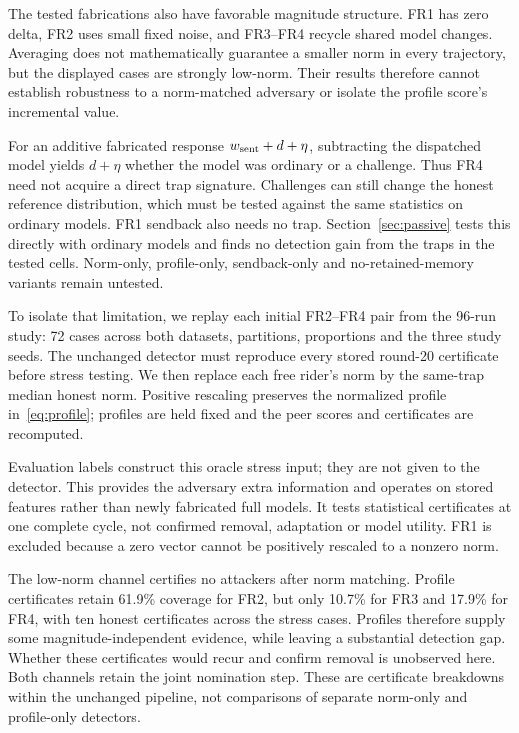 \documentclass[journal]{IEEEtran}
\makeatletter
\renewcommand{\subsection}{\@startsection{subsection}{2}{\z@}{1.5ex}{0.7ex}{\normalfont\normalsize\itshape}}
\makeatother
\begin{document}
The tested fabrications also have favorable magnitude structure. FR1
has zero delta, FR2 uses small fixed noise, and FR3--FR4 recycle shared
model changes. Averaging does not mathematically guarantee a smaller norm
in every trajectory, but the displayed cases are strongly low-norm.
Their results therefore cannot establish robustness to a norm-matched
adversary or isolate the profile score's incremental value.

For an additive fabricated response $w_{\rm sent}+d+\eta$, subtracting
the dispatched model yields $d+\eta$ whether the model was ordinary or a
challenge. Thus FR4 need not acquire a direct trap signature. Challenges
can still change the honest reference distribution, which must be tested
against the same statistics on ordinary models. FR1 sendback also needs
no trap. Section~\ref{sec:passive} tests this directly with ordinary
models and finds no detection gain from the traps in the tested cells.
Norm-only, profile-only, sendback-only and no-retained-memory variants
remain untested.

\subsection{Oracle Norm-Matching Feature Diagnostic}
To isolate that limitation, we replay each initial FR2--FR4 pair from the
96-run study: 72 cases across both datasets, partitions, proportions and
the three study seeds. The unchanged detector must reproduce every
stored round-20 certificate before stress testing. We then replace each
free rider's norm by the same-trap median honest norm. Positive rescaling
preserves the normalized profile in~\eqref{eq:profile}; profiles are held
fixed and the peer scores and certificates are recomputed.

Evaluation labels construct this oracle stress input; they are not given
to the detector. This provides the adversary extra information and
operates on stored features rather than newly fabricated full models.
It tests statistical certificates at one complete cycle, not confirmed
removal, adaptation or model utility. FR1 is excluded because a zero
vector cannot be positively rescaled to a nonzero norm.

The low-norm channel certifies no attackers after norm matching.
Profile certificates retain 61.9\% coverage for FR2, but only 10.7\%
for FR3 and 17.9\% for FR4, with ten honest certificates across the
stress cases. Profiles therefore supply some magnitude-independent
evidence, while leaving a substantial detection gap. Whether these
certificates would recur and confirm removal is unobserved here.
Both channels retain the joint nomination step. These are certificate
breakdowns within the unchanged pipeline, not comparisons of separate
norm-only and profile-only detectors.
\end{document}
